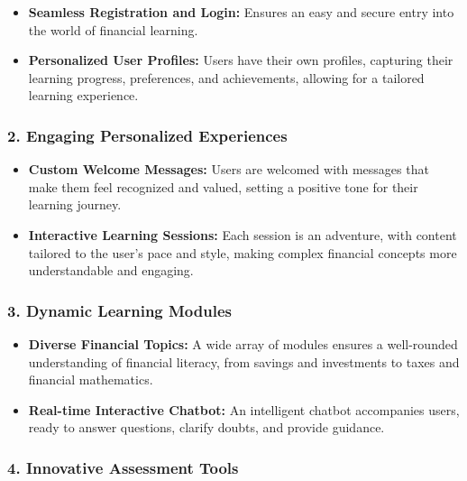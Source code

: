 \begin{itemize}
\tightlist
\item
  \textbf{Seamless Registration and Login:} Ensures an easy and secure
  entry into the world of financial learning.
\item
  \textbf{Personalized User Profiles:} Users have their own profiles,
  capturing their learning progress, preferences, and achievements,
  allowing for a tailored learning experience.
\end{itemize}

\hypertarget{engaging-personalized-experiences}{%
\subsubsection{2. Engaging Personalized
Experiences}\label{engaging-personalized-experiences}}

\begin{itemize}
\tightlist
\item
  \textbf{Custom Welcome Messages:} Users are welcomed with messages
  that make them feel recognized and valued, setting a positive tone for
  their learning journey.
\item
  \textbf{Interactive Learning Sessions:} Each session is an adventure,
  with content tailored to the user's pace and style, making complex
  financial concepts more understandable and engaging.
\end{itemize}

\hypertarget{dynamic-learning-modules}{%
\subsubsection{3. Dynamic Learning
Modules}\label{dynamic-learning-modules}}

\begin{itemize}
\tightlist
\item
  \textbf{Diverse Financial Topics:} A wide array of modules ensures a
  well-rounded understanding of financial literacy, from savings and
  investments to taxes and financial mathematics.
\item
  \textbf{Real-time Interactive Chatbot:} An intelligent chatbot
  accompanies users, ready to answer questions, clarify doubts, and
  provide guidance.
\end{itemize}

\hypertarget{innovative-assessment-tools}{%
\subsubsection{4. Innovative Assessment
Tools}\label{innovative-assessment-tools}}

